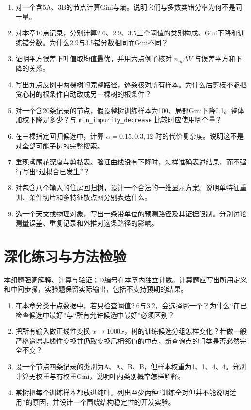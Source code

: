 \chapterexercise
\begin{enumerate}
\item 对一个含5A、3B的节点计算Gini与熵。说明它们与多数类错分率为何不是同一量。
\item 对本章10点记录，分别计算2.6、2.9、3.5三个阈值的类别构成、Gini下降和训练错分数。为什么2.9与3.5错分数相同而Gini不同？
\item 证明平方误差下叶值取均值最优，并用六点例子核对 $n_m\Delta V$ 与误差平方和下降的关系。
\item 写出九点反例中两棵树的完整路径，逐条核对所有样本。为什么后剪枝不能把贪心树的根条件自动改成另一棵树的根条件？
\item 对一个含20条记录的节点，假设整树训练样本为100、局部Gini下降0.1。整体加权下降是多少？与 \texttt{min\_impurity\_decrease} 比较时应使用哪个量？
\item 在三棵指定回归候选中，计算 $\alpha=0.15,0.3,12$ 时的代价复杂度。说明这不是对全部可能子树的完整搜索。
\item 重现鸢尾花深度与剪枝表。验证曲线没有下降时，怎样准确表述结果，而不强行写出“过拟合已发生”？
\item 对包含八个输入的住房回归树，设计一个合法的一维显示方案。说明单特征重训、条件切片和多特征散点图分别表达什么。
\item 选一个天文或物理对象，写出一条带单位的预测路径及其证据限制。分别讨论测量误差、重复记录和外推对这条路径的影响。
\end{enumerate}

\section*{深化练习与方法检验}
本组题强调解释、计算与验证；D编号在本章内独立计数。计算题应写出所用定义和中间步骤，实验题保留实际输出，包括不支持预期的结果。
\begin{enumerate}[label=D\arabic*.]
\item 在本章分类十点数据中，若只检查阈值2.6与3.2，会选择哪一个？为什么“在已检查候选中最好”与“所有允许候选中最好”必须区别？
\item 把所有输入做正线性变换 $x\mapsto1000x$，树的训练候选分组怎样变化？若做一般严格递增非线性变换并仍取变换后相邻值的中点，新查询点的归类是否必然完全不变？
\item 设一个节点四条记录的类别为A、A、B、B，但样本权重为1、1、4、4。分别计算无权重与有权重Gini，说明叶内类别概率怎样解释。
\item 某树把每个训练样本都放进纯叶。列出至少两种“训练全对但并不能说明适用”的原因，并设计一个围绕结构稳定性的开发实验。
\end{enumerate}
